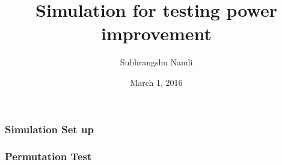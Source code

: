 \documentclass[10pt,dvipsnames,table]{beamer}
\title[Simulation]{Simulation for testing power improvement}
\author{Subhrangshu Nandi}
\institute[Prelim exam]{Preliminary Exam \\
Department of Statistics \\
University of Wisconsin-Madison}
\date{March 1, 2016}
\begin{document}
\setlength{\baselineskip}{16truept}


\begin{frame}
\frametitle{Simulation Set up}


\end{frame}

\begin{frame}
\frametitle{Permutation Test}


\end{frame}
\end{document}
